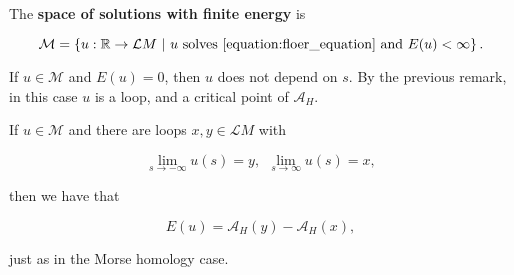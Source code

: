 \begin{deff} \label{definition:finite_energy_space}
The {\bf space of solutions with finite energy} is

$$\mathcal{M} = \left\{ u : \mathbb{R} \rightarrow \mathcal{L}M \ | \ u \text{ solves \ref{equation:floer_equation} and } E(u) < \infty \right\} .$$
\end{deff}

\begin{rmrk}
If $u \in \mathcal{M}$ and $E(u) = 0$, then $u$ does not depend on $s$. By the previous remark, in this case $u$ is a loop, and a critical point of $\mathcal{A}_H$.
\end{rmrk}

\begin{rmrk}
If $u \in \mathcal{M}$ and there are loops $x,y \in \mathcal{L}M$ with

$$\lim_{s \rightarrow -\infty} u(s) = y, \ \ \lim_{s \rightarrow \infty} u(s) = x ,$$

then we have that

$$E(u) = \mathcal{A}_H(y) - \mathcal{A}_H(x) ,$$

just as in the Morse homology case.
\end{rmrk}
